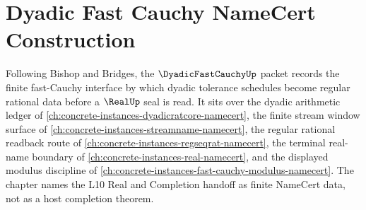 \chapter{Dyadic Fast Cauchy NameCert Construction}
\label{ch:concrete-instances-dyadic-fast-cauchy-namecert}

Following Bishop and Bridges, the $\DyadicFastCauchyUp$ packet records the finite fast-Cauchy interface by which dyadic tolerance schedules become regular rational data before a $\RealUp$ seal is read. It sits over the dyadic arithmetic ledger of \autoref{ch:concrete-instances-dyadicratcore-namecert}, the finite stream window surface of \autoref{ch:concrete-instances-streamname-namecert}, the regular rational readback route of \autoref{ch:concrete-instances-regseqrat-namecert}, the terminal real-name boundary of \autoref{ch:concrete-instances-real-namecert}, and the displayed modulus discipline of \autoref{ch:concrete-instances-fast-cauchy-modulus-namecert}. The chapter names the L10 Real and Completion handoff as finite NameCert data, not as a host completion theorem.

